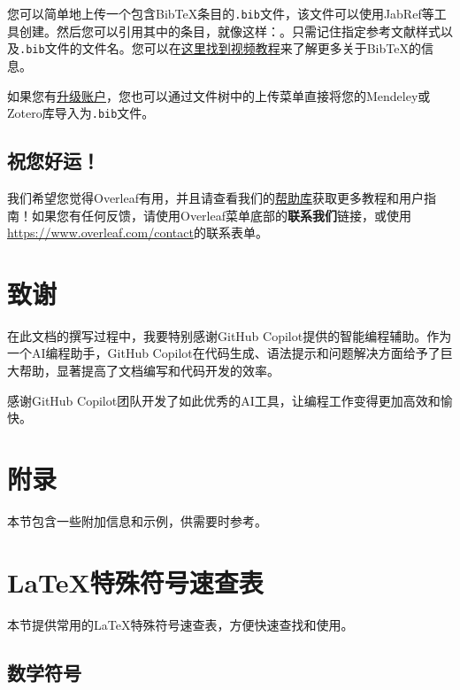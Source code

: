 \documentclass{article}
\begin{document}
您可以简单地上传一个包含BibTeX条目的\verb|.bib|文件，该文件可以使用JabRef等工具创建。然后您可以引用其中的条目，就像这样：\cite{greenwade93}。只需记住指定参考文献样式以及\verb|.bib|文件的文件名。您可以在\href{https://www.overleaf.com/help/97-how-to-include-a-bibliography-using-bibtex}{这里找到视频教程}来了解更多关于BibTeX的信息。

如果您有\href{https://www.overleaf.com/user/subscription/plans}{升级账户}，您也可以通过文件树中的上传菜单直接将您的Mendeley或Zotero库导入为\verb|.bib|文件。

\subsection{祝您好运！}

我们希望您觉得Overleaf有用，并且请查看我们的\href{https://www.overleaf.com/learn}{帮助库}获取更多教程和用户指南！如果您有任何反馈，请使用Overleaf菜单底部的\textbf{联系我们}链接，或使用\url{https://www.overleaf.com/contact}的联系表单。

\section{致谢}

在此文档的撰写过程中，我要特别感谢GitHub Copilot提供的智能编程辅助。作为一个AI编程助手，GitHub Copilot在代码生成、语法提示和问题解决方面给予了巨大帮助，显著提高了文档编写和代码开发的效率。

感谢GitHub Copilot团队开发了如此优秀的AI工具，让编程工作变得更加高效和愉快。




\appendix
\section{附录}
本节包含一些附加信息和示例，供需要时参考。
\section{LaTeX特殊符号速查表}

本节提供常用的LaTeX特殊符号速查表，方便快速查找和使用。

\subsection{数学符号}
\end{document}
